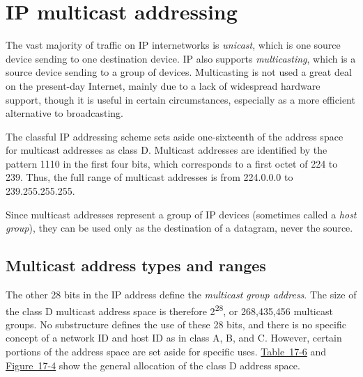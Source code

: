 \documentclass[b5paper,11pt]{memoir}
\begin{document}
\section{IP multicast addressing}

The vast majority of traffic on IP internetworks is {\emph{unicast}},
which is one source device sending to one destination device. IP also
supports { \emph{multicasting}}, which is a source device sending to a
group of devices. Multicasting is not used a great deal on the
present-day Internet, mainly due to a lack of widespread hardware
support, though it is useful in certain circumstances, especially as a
more efficient alternative to
broadcasting.\protect\hypertarget{ch17s06.htmlux5cux23idx-CHP-17-0707}{}{}

The classful IP addressing scheme sets aside one-sixteenth of the
address space for
\protect\hypertarget{ch17s06.htmlux5cux23idx-CHP-17-0708}{}{}multicast
addresses as class D. Multicast addresses are identified by the pattern
1110 in the first four bits, which corresponds to a first octet of 224
to 239. Thus, the full range of multicast addresses is from 224.0.0.0 to
239.255.255.255.

Since multicast addresses represent a group of IP devices (sometimes
called a {\emph{host group}}), they can be used only as the destination
of a datagram, never the source.



\subsection{Multicast address types and ranges}

The other 28 bits in the IP address define the {\emph{multicast group
address}}. The size of the class D multicast address space is therefore
2\textsuperscript{28}, or 268,435,456 multicast
\protect\hypertarget{ch17s06.htmlux5cux23idx-CHP-17-0709}{}{}groups. No
substructure defines the use of these 28 bits, and there is no specific
concept of a network ID and host ID as in class A, B, and C. However,
certain portions of the address space are set aside for specific uses.
\protect\hyperlink{ch17s06.htmlux5cux23ip_multicast_address_ranges_and_uses}{Table~17-6}
and
\protect\hyperlink{ch17s06.htmlux5cux23ip_multicast_address_ranges_and_uses_all}{Figure~17-4}
show the general allocation of the class D address
space.\protect\hypertarget{ch17s06.htmlux5cux23idx-CHP-17-0710}{}{}\protect\hypertarget{ch17s06.htmlux5cux23idx-CHP-17-0711}{}{}
\end{document}
